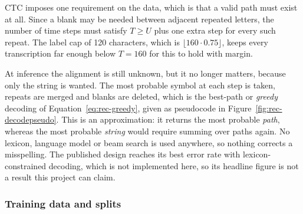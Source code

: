 CTC imposes one requirement on the data, which is that a valid path must exist at all. Since a blank may be needed between adjacent repeated letters, the number of time steps must satisfy $T\ge U$ plus one extra step for every such repeat. The label cap of 120 characters, which is $\lfloor160\cdot0.75\rfloor$, keeps every transcription far enough below $T=160$ for this to hold with margin.

At inference the alignment is still unknown, but it no longer matters, because only the string is wanted. The most probable symbol at each step is taken, repeats are merged and blanks are deleted, which is the best-path or \emph{greedy} decoding of Equation~\ref{eq:rec-greedy}, given as pseudocode in Figure~\ref{fig:rec-decodepseudo}. This is an approximation: it returns the most probable \emph{path}, whereas the most probable \emph{string} would require summing over paths again. No lexicon, language model or beam search is used anywhere, so nothing corrects a misspelling. The published design reaches its best error rate with lexicon-constrained decoding, which is not implemented here, so its headline figure is not a result this project can claim.



\subsubsection{Training data and splits}

